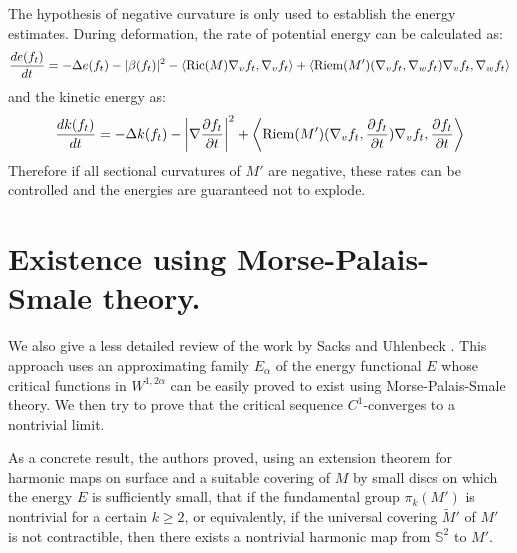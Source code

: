 The hypothesis of negative curvature is only used to establish the energy
estimates. During deformation, the rate of potential energy can be calculated as: 
\[
 \frac{d e(f_t)}{dt}= -\Delta e(f_t) - |\beta(f_t)|^2 - \left\langle \mathop{\rm Ric}\nolimits(M) \nabla_v
f_t,\nabla_v f_t \rangle + \langle \mathop{\rm Riem}\nolimits(M') (\nabla_v f_t,\nabla_w f_t)\nabla_v
f_t,\nabla_w f_t \right\rangle
\]
and the kinetic energy as:
\[
 \frac{d k(f_t)}{dt}= -\Delta k(f_t) - \left|\nabla \frac{\partial f_t}{\partial t}\right|^2 +
\left\langle \mathop{\rm Riem}\nolimits(M') (\nabla_v f_t,\frac{\partial f_t}{\partial t})\nabla_v
f_t,\frac{\partial f_t}{\partial t} \right\rangle
\]
Therefore if all sectional curvatures of \(M'\) are negative, these rates can be
controlled and the energies are guaranteed not to explode.

\section{Existence using Morse-Palais-Smale theory.}
\label{sec:org2d4fdaf}
We also give a less detailed review of the work by Sacks and Uhlenbeck
\cite{sacks_existence_1981}. This approach uses an approximating family \(E_\alpha\) of the energy functional \(E\) whose critical functions in \(W^{1,2\alpha}\) can be easily proved
to exist using Morse-Palais-Smale theory. We then try to prove that the critical sequence
\(C^1\)-converges to a nontrivial limit. 

As a concrete result, the authors proved,
using an extension theorem for harmonic maps on surface and a suitable covering of \(M\) by small discs on which the energy \(E\) is sufficiently small, that if
the fundamental group \(\pi_k(M')\) is nontrivial for a certain \(k\geq 2\), or
equivalently, if the universal covering \(\tilde M'\) of \(M'\) is not contractible,
then there exists a nontrivial harmonic map from \(\mathbb{S}^2\) to \(M'\).


\iffalse


\fi
